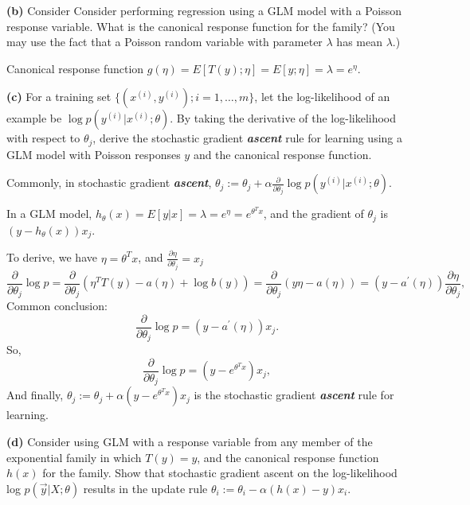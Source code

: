 \documentclass[11pt]{article}
\renewcommand\part[1]{\vspace{.10in}\textbf{(#1)  }}
\begin{document}
\part{b}Consider Consider performing regression using a GLM model with a Poisson response variable. What is the canonical response function for the family? (You may use the fact that a Poisson random variable with parameter $\lambda$ has mean $\lambda$.)

Canonical response function $g(\eta) = E[T(y); \eta] = E[y; \eta] = \lambda = e^\eta$.

\part{c} For a training set $\{(x^{(i)}, y^{(i)}); i = 1,\dots, m\}$, let the log-likelihood of an example be $\log p(y^{(i)}|x^{(i)}; \theta)$. By taking the derivative of the log-likelihood with respect to $\theta_j$, derive the stochastic gradient \emph{\textbf{ascent}} rule for learning using a GLM model with Poisson responses $y$ and the canonical response function.

Commonly, in stochastic gradient \emph{\textbf{ascent}}, $\theta_j := \theta_j + \alpha \frac{\partial}{\partial \theta_j}\log p(y^{(i)}|x^{(i)}; \theta)$.

In a GLM model, $h_\theta(x) = E[y | x] = \lambda = e^\eta = e^{\theta^Tx}$, and the gradient of $\theta_j$ is $(y - h_\theta(x))x_j$.

To derive, we have $\eta = \theta^Tx$, and $\frac{\partial \eta}{\partial \theta_j} = x_j$
$$\frac{\partial}{\partial \theta_j}\log p = \frac{\partial}{\partial \theta_j}\left(\eta^TT(y) - a(\eta) + \log b(y)\right) = \frac{\partial}{\partial \theta_j}\left(y\eta - a(\eta)\right) = (y - a^\prime(\eta))\frac{\partial \eta}{\partial \theta_j},$$
Common conclusion: $$\frac{\partial}{\partial \theta_j}\log p = (y - a^\prime(\eta))x_j.$$
So, $$\frac{\partial}{\partial \theta_j}\log p = (y - e^{\theta^Tx})x_j,$$
And finally, $\theta_j := \theta_j + \alpha (y - e^{\theta^Tx})x_j$ is the stochastic gradient \emph{\textbf{ascent}} rule for learning.

\part{d}Consider using GLM with a response variable from any member of the exponential family in which $T(y) = y$, and the canonical response function $h(x)$ for the family. Show that stochastic gradient ascent on the log-likelihood log $p(\overrightarrow{y}|X; \theta)$ results in the update rule $\theta_i := \theta_i - \alpha(h(x)- y)x_i$.
\end{document}
